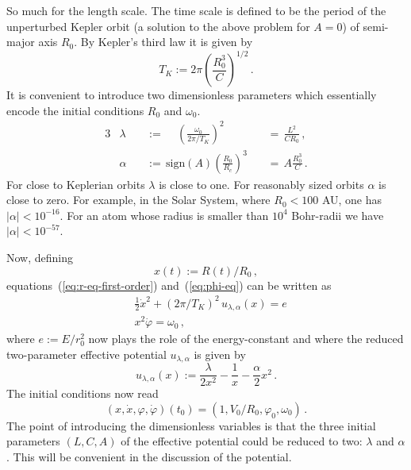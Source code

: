 \documentclass
[rmp,aps,twocolumn,showpacs,preprintnumbers,amsmath,amssymb]{revtex4}
\theoremstyle{plain}
\theoremstyle{definition}
\theoremstyle{remark}
\begin{document}
So much for the length scale. The time scale is defined to be 
the period of the unperturbed Kepler orbit (a solution to the 
above problem for $A=0$) of semi-major axis $R_0$. By Kepler's 
third law it is given by 
%
\begin{equation}\label{eq:T-Kepler}
  T_K := 2\pi \left( \frac{R_0^3}{C} \right)^{1/2} \,.
\end{equation}
%
It is convenient to introduce two dimensionless parameters which 
essentially encode the initial conditions $R_0$ and $\omega_0$.
%
\begin{alignat}{3}
\label{eq:def-lambda}
&\lambda &&\,:=\,\quad\left( \frac{\omega_0}{2\pi/T_K} \right)^2
         &&\,=\,\frac{L^2}{C R_0}\,, \\
\label{eq:def-alpha}
&\alpha  &&\,:=\,\mathrm{sign}(A)\left( \frac{R_0}{R_c} \right)^3
         &&\,=\, A\frac{R_0^3}{C} \, .
\end{alignat}
%
For close to Keplerian orbits $\lambda$ is close to one. For reasonably 
sized orbits $\alpha$ is close to zero. For example, in the Solar 
System, where $R_0 < 100$ AU, one has $|\alpha| < 10^{-16}$. For an atom 
whose radius is smaller than $10^4$ Bohr-radii we have $|\alpha|<10^{-57}$.

Now, defining 
%
\begin{equation}\label{eq:def-x}
  x(t):=R(t)/R_0\,,
\end{equation}
%
equations~(\ref{eq:r-eq-first-order}) and~(\ref{eq:phi-eq}) can be 
written as
%
\begin{align}
  \label{eq:x-eq}
  &\frac{1}{2}\dot{x}^2 + (2\pi/T_K)^2 \, u_{\lambda,\alpha}(x) = e \\
  \label{eq:phi-x-eq}
  &x^2\dot{\varphi} = \omega_0\,,
\end{align}
%
where $e:=E/r_0^2$ now plays the role of the energy-constant and 
where the reduced two-parameter effective potential $u_{\lambda,\alpha}$ 
is given by  
%
\begin{equation}\label{eq:potential-x}
u_{\lambda,\alpha}(x) := \frac{\lambda}{2x^2}
                        -\frac{1}{x}
                        -\frac{\alpha}{2} x^2\,.
\end{equation}
%
The initial conditions now read
%
\begin{equation}\label{eq:InitCond} 
  (x,\dot{x},\varphi,\dot{\varphi})(t_0) = (1,V_0/R_0,\varphi_0,\omega_0)\,.
\end{equation}
%
The point of introducing the dimensionless variables is that the 
three initial parameters $(L,C,A)$ of the effective potential 
could be reduced to two: $\lambda$ and $\alpha$. This will be 
convenient in the discussion of the potential.
\end{document}
